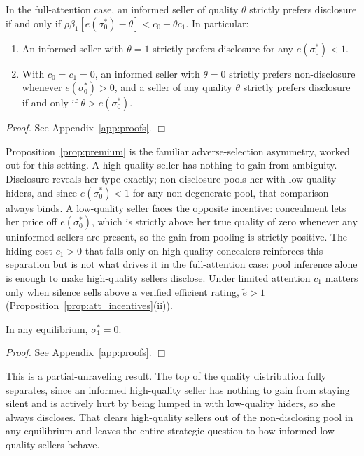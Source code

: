 \begin{proposition}
\label{prop:premium}
In the full-attention case, an informed seller of quality $\theta$ strictly prefers disclosure if and only if $\rho\beta_1[e(\sigma_0^*)-\theta]<c_0+\theta c_1$. In particular:
\begin{enumerate}[label=(\roman*)]
    \item An informed seller with $\theta=1$ strictly prefers disclosure for any $e(\sigma_0^*)<1$.
    \item With $c_0=c_1=0$, an informed seller with $\theta=0$ strictly prefers non-disclosure whenever $e(\sigma_0^*)>0$, and a seller of any quality $\theta$ strictly prefers disclosure if and only if $\theta>e(\sigma_0^*)$.
\end{enumerate}
\end{proposition}

\noindent\textit{Proof.} See Appendix~\ref{app:proofs}. $\Box$

Proposition~\ref{prop:premium} is the familiar adverse-selection asymmetry, worked out for this setting. A high-quality seller has nothing to gain from ambiguity. Disclosure reveals her type exactly; non-disclosure pools her with low-quality hiders, and since $e(\sigma_0^*)<1$ for any non-degenerate pool, that comparison always binds. A low-quality seller faces the opposite incentive: concealment lets her price off $e(\sigma_0^*)$, which is strictly above her true quality of zero whenever any uninformed sellers are present, so the gain from pooling is strictly positive. The hiding cost $c_1>0$ that falls only on high-quality concealers reinforces this separation but is not what drives it in the full-attention case: pool inference alone is enough to make high-quality sellers disclose. Under limited attention $c_1$ matters only when silence sells above a verified efficient rating, $\tilde e>1$ (Proposition~\ref{prop:att_incentives}(ii)).

\begin{corollary}
\label{cor:hq_disclose}
In any equilibrium, $\sigma_1^*=0$.
\end{corollary}

\noindent\textit{Proof.} See Appendix~\ref{app:proofs}. $\Box$

This is a partial-unraveling result. The top of the quality distribution fully separates, since an informed high-quality seller has nothing to gain from staying silent and is actively hurt by being lumped in with low-quality hiders, so she always discloses. That clears high-quality sellers out of the non-disclosing pool in any equilibrium and leaves the entire strategic question to how informed low-quality sellers behave.

